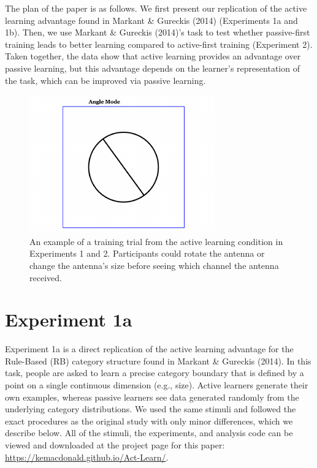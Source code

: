 \documentclass[10pt, letterpaper]{article}
\newenvironment{CodeChunk}{}{}
\begin{document}
The plan of the paper is as follows. We first present our replication of
the active learning advantage found in Markant \& Gureckis (2014)
(Experiments 1a and 1b). Then, we use Markant \& Gureckis (2014)'s task
to test whether passive-first training leads to better learning compared
to active-first training (Experiment 2). Taken together, the data show
that active learning provides an advantage over passive learning, but
this advantage depends on the learner's representation of the task,
which can be improved via passive learning.

\begin{CodeChunk}
\begin{figure}[t]

{\centering \includegraphics{figs/stimuli_exp1-1} 

}

\caption[An example of a training trial from the active learning condition in Experiments 1 and 2]{An example of a training trial from the active learning condition in Experiments 1 and 2. Participants could rotate the antenna or change the antenna's size before seeing which channel the antenna received.}\label{fig:stimuli_exp1}
\end{figure}
\end{CodeChunk}

\section{Experiment 1a}\label{experiment-1a}

Experiment 1a is a direct replication of the active learning advantage
for the Rule-Based (RB) category structure found in Markant \& Gureckis
(2014). In this task, people are asked to learn a precise category
boundary that is defined by a point on a single continuous dimension
(e.g., size). Active learners generate their own examples, whereas
passive learners see data generated randomly from the underlying
category distributions. We used the same stimuli and followed the exact
procedures as the original study with only minor differences, which we
describe below. All of the stimuli, the experiments, and analysis code
can be viewed and downloaded at the project page for this paper:
\url{https://kemacdonald.github.io/Act-Learn/}.
\end{document}
